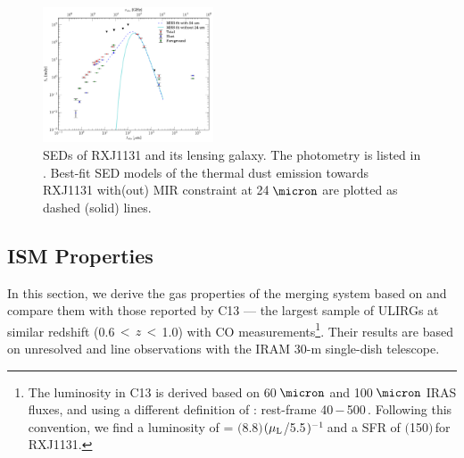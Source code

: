 \documentclass[]{emulateapj}
\begin{document}
\begin{figure}[!htbp]
\centering
\includegraphics[trim=5 5 5 5, clip, width=0.45\textwidth]{../Figures/FullSED}
\caption{SEDs of RXJ1131 and its lensing galaxy. The photometry is listed in .
Best-fit SED models of the thermal dust emission towards RXJ1131
with(out) MIR constraint at 24\,$\micron$ are plotted as dashed (solid) lines.
\label{fig:SED}}
\end{figure}

\subsection{ISM Properties} \label{sec:properties}
In this section, we derive the gas properties of the merging system
based on \bco and compare them with those reported by
C13 --- the largest sample of ULIRGs at similar redshift
(0.6\,$<$\,$z$\,$<$\,1.0) with CO measurements\footnote{The
\fir luminosity in C13 is derived based on 60\,$\micron$ and 100\,$\micron$ IRAS fluxes,
and using a different definition of
\LFIR: rest-frame 40\,$-$\,500\,\micron. Following this convention,
we find a \fir luminosity of
\LFIR = $($8.8$)$$(\mu_{\rm L}$/5.5$)\mbox{$^{-1}$}$\,\Lsun and
a SFR of $($150$)$\,\sfrU for RXJ1131.}.
Their results are based on unresolved \bco and  line observations with the
IRAM 30-m single-dish telescope.
\end{document}
